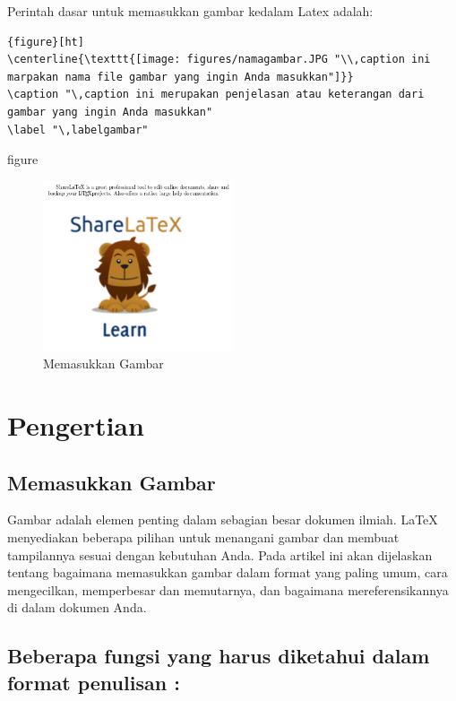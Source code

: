 Perintah dasar untuk memasukkan gambar kedalam Latex adalah:

\begin{lstlisting}{figure}[ht]
\centerline{\texttt{[image: figures/namagambar.JPG "\\,caption ini marpakan nama file gambar yang ingin Anda masukkan"]}}
\caption "\,caption ini merupakan penjelasan atau keterangan dari gambar yang ingin Anda masukkan"
\label "\,labelgambar"
\end{lstlisting}{figure}


\begin{figure}[ht]
	\centerline{\includegraphics[width=0.50\textwidth]{gambar/dapi13.jpg}}
	\caption{Memasukkan Gambar}
	\label{Memasukkan Gambar}
\end{figure}

\section {Pengertian }
\subsection {Memasukkan Gambar}
{\fontsize{10pt}{10pt}\selectfont  \hspace*{0.64in} Gambar adalah elemen penting dalam sebagian besar dokumen ilmiah. LaTeX menyediakan beberapa pilihan untuk menangani gambar dan membuat tampilannya sesuai dengan kebutuhan Anda. Pada artikel ini akan dijelaskan tentang  bagaimana memasukkan gambar dalam format yang paling umum, cara mengecilkan, memperbesar dan memutarnya, dan bagaimana mereferensikannya di dalam dokumen Anda.} \par

\subsection {Beberapa fungsi yang harus diketahui dalam format penulisan :}


